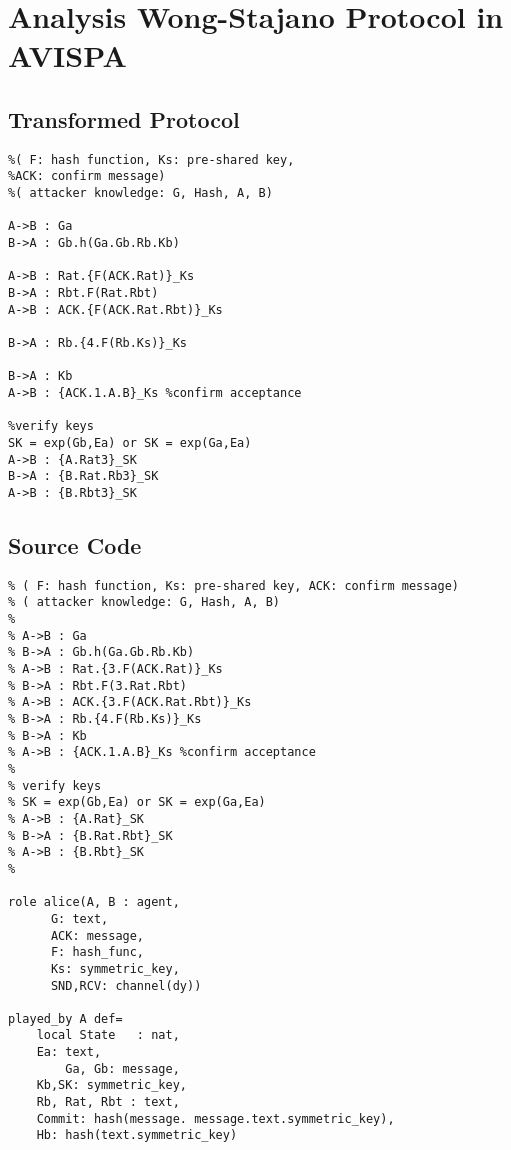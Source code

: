 
\chapter{Analysis Wong-Stajano Protocol in AVISPA} %

\label{AppendixB} %

\section{Transformed Protocol}

{\small 
\begin{Verbatim}[fontsize=\small]
%Wong Stajano Protocol - OOB Transformation
%( F: hash function, Ks: pre-shared key, 
%ACK: confirm message)
%( attacker knowledge: G, Hash, A, B)

A->B : Ga
B->A : Gb.h(Ga.Gb.Rb.Kb)

A->B : Rat.{F(ACK.Rat)}_Ks
B->A : Rbt.F(Rat.Rbt)
A->B : ACK.{F(ACK.Rat.Rbt)}_Ks

B->A : Rb.{4.F(Rb.Ks)}_Ks

B->A : Kb
A->B : {ACK.1.A.B}_Ks %confirm acceptance

%verify keys
SK = exp(Gb,Ea) or SK = exp(Ga,Ea)
A->B : {A.Rat3}_SK
B->A : {B.Rat.Rb3}_SK
A->B : {B.Rbt3}_SK
\end{Verbatim}

\section{Source Code}
{\small 
\begin{Verbatim}[fontsize=\small]
%%Wong Stajano Protocol - OOB Transformation
% ( F: hash function, Ks: pre-shared key, ACK: confirm message)
% ( attacker knowledge: G, Hash, A, B)
%
% A->B : Ga
% B->A : Gb.h(Ga.Gb.Rb.Kb)
% A->B : Rat.{3.F(ACK.Rat)}_Ks
% B->A : Rbt.F(3.Rat.Rbt)
% A->B : ACK.{3.F(ACK.Rat.Rbt)}_Ks
% B->A : Rb.{4.F(Rb.Ks)}_Ks
% B->A : Kb
% A->B : {ACK.1.A.B}_Ks %confirm acceptance
%
% verify keys
% SK = exp(Gb,Ea) or SK = exp(Ga,Ea)
% A->B : {A.Rat}_SK
% B->A : {B.Rat.Rbt}_SK
% A->B : {B.Rbt}_SK
%

role alice(A, B : agent,
	  G: text,
      ACK: message,
      F: hash_func,
	  Ks: symmetric_key,
	  SND,RCV: channel(dy))

played_by A def=
	local State   : nat,
	Ea: text,
        Ga, Gb: message,
	Kb,SK: symmetric_key, 
	Rb, Rat, Rbt : text,
 	Commit: hash(message. message.text.symmetric_key),
	Hb: hash(text.symmetric_key)


\end{Verbatim}}}
